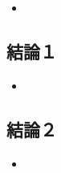 \begin{itemize}
\tightlist
\item
\end{itemize}

\subsection{結論１}\label{ux7d50ux8ad6uxff11}

\begin{itemize}
\tightlist
\item
\end{itemize}

\subsection{結論２}\label{ux7d50ux8ad6uxff12}

\begin{itemize}
\tightlist
\item
\end{itemize}
